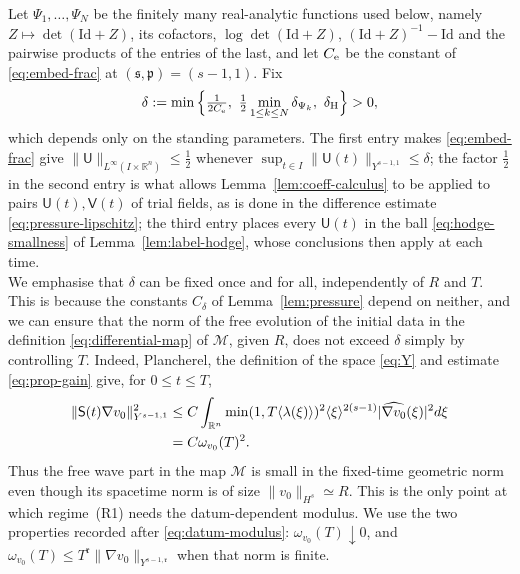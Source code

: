 \documentclass[11pt,reqno]{amsart}
\theoremstyle{plain}
\theoremstyle{definition}
\theoremstyle{remark}
\numberwithin{equation}{section}
\newcommand{\sreg}{\mathfrak s}
\newcommand{\preg}{\mathfrak p}
\newcommand{\rpar}{\mathfrak r}
\newcommand{\Ufield}{\mathsf U}
\newcommand{\Vfield}{\mathsf V}
\newcommand{\Sprop}{\mathsf S}
\newcommand{\Real}{\mathbb R}
\newcommand{\Rn}{\Real^n}
\begin{document}
Let $\Psi_1,\dots,\Psi_N$ be the finitely many real-analytic functions used
below, namely $Z\mapsto\det(\mathrm{Id}+Z)$, its cofactors,
$\log\det(\mathrm{Id}+Z)$, $(\mathrm{Id}+Z)^{-1}-\mathrm{Id}$ and the pairwise
products of the entries of the last, and let $C_{\rm e}$ be the constant of
\eqref{eq:embed-frac} at $(\sreg,\preg)=(s-1,1)$.  Fix
\begin{equation}\label{eq:delta-choice}
 \delta:=\min\Big\{\tfrac1{2C_{\rm e}},\
 \tfrac12\min_{1\le k\le N}\delta_{\Psi_k},\
 \delta_{\rm H}\Big\}>0,
\end{equation}
which depends only on the standing parameters.  The first entry makes
\eqref{eq:embed-frac} give $\|\Ufield\|_{L^\infty(I\times\Rn)}\le\frac12$ whenever
$\sup_{t\in I}\|\Ufield(t)\|_{Y^{s-1,1}}\le\delta$; the factor $\frac12$ in the
second entry is what allows Lemma~\ref{lem:coeff-calculus} to be applied to
pairs $\Ufield(t),\Vfield(t)$ of trial fields, as is done in the
difference estimate \eqref{eq:pressure-lipschitz}; the third entry places
every $\Ufield(t)$ in the ball \eqref{eq:hodge-smallness} of
Lemma~\ref{lem:label-hodge}, whose conclusions then apply at each time.\\
We emphasise that $\delta$ can be fixed once and for all,
independently of $R$ and $T$. This is because the constants $C_\delta$ of
Lemma~\ref{lem:pressure} depend on neither, and we can ensure that the norm of the free evolution of the initial data in the definition \eqref{eq:differential-map} of $\mathcal{M}$, given $R$, does not exceed $\delta$ simply by controlling $T$.  Indeed, Plancherel, the definition of the space \eqref{eq:Y} and
estimate \eqref{eq:prop-gain} give, for $0\le t\le T$,
\begin{align}
 \|\Sprop(t)\nabla v_0\|_{Y^{s-1,1}}^2
 &\le C\int_{\Rn}
   \min(1,T\langle\lambda(\xi)\rangle)^2
   \langle\xi\rangle^{2(s-1)}
   |\widehat{\nabla v_0}(\xi)|^2 d\xi \notag\\
 &=C\omega_{v_0}(T)^2.
 \label{eq:free-fixed-time-modulus}
\end{align}
Thus the free wave part in the map $\mathcal{M}$ is small in the fixed-time geometric norm even though its
spacetime norm is of size $\|v_0\|_{H^s}\simeq R$.  This is the only point at which
regime~\textup{(R1)} needs the datum-dependent modulus.  We use the two
properties recorded after \eqref{eq:datum-modulus}:
$\omega_{v_0}(T)\downarrow0$, and
$\omega_{v_0}(T)\le T^{\rpar}
\|\nabla v_0\|_{Y^{s-1,\rpar}}$ when that norm is finite.\\
\end{document}
